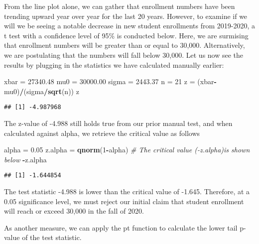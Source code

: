 \documentclass[
]{article}
\newenvironment{Shaded}{\begin{snugshade}}{\end{snugshade}}
\newcommand{\CommentTok}[1]{\textcolor[rgb]{0.56,0.35,0.01}{\textit{#1}}}
\newcommand{\DecValTok}[1]{\textcolor[rgb]{0.00,0.00,0.81}{#1}}
\newcommand{\FloatTok}[1]{\textcolor[rgb]{0.00,0.00,0.81}{#1}}
\newcommand{\KeywordTok}[1]{\textcolor[rgb]{0.13,0.29,0.53}{\textbf{#1}}}
\newcommand{\NormalTok}[1]{#1}
\newcommand{\OperatorTok}[1]{\textcolor[rgb]{0.81,0.36,0.00}{\textbf{#1}}}
\newcommand{\StringTok}[1]{\textcolor[rgb]{0.31,0.60,0.02}{#1}}
\begin{document}
From the line plot alone, we can gather that enrollment numbers have
been trending upward year over year for the last 20 years. However, to
examine if we will we be seeing a notable decrease in new student
enrollments from 2019-2020, a t test with a confidence level of 95\% is
conducted below. Here, we are surmising that enrollment numbers will be
greater than or equal to 30,000. Alternatively, we are postulating that
the numbers will fall below 30,000. Let us now see the results by
plugging in the statistics we have calculated manually earlier:

\begin{Shaded}
\begin{Highlighting}[]
\NormalTok{xbar =}\StringTok{ }\FloatTok{27340.48}
\NormalTok{mu0 =}\StringTok{ }\FloatTok{30000.00}
\NormalTok{sigma =}\StringTok{ }\FloatTok{2443.37}
\NormalTok{n =}\StringTok{ }\DecValTok{21}
\NormalTok{z =}\StringTok{ }\NormalTok{(xbar}\OperatorTok{-}\NormalTok{mu0)}\OperatorTok{/}\NormalTok{(sigma}\OperatorTok{/}\KeywordTok{sqrt}\NormalTok{(n))}
\NormalTok{z}
\end{Highlighting}
\end{Shaded}

\begin{verbatim}
## [1] -4.987968
\end{verbatim}

The z-value of -4.988 still holds true from our prior manual test, and
when calculated against alpha, we retrieve the critical value as follows

\begin{Shaded}
\begin{Highlighting}[]
\NormalTok{alpha =}\StringTok{ }\FloatTok{0.05}
\NormalTok{z.alpha =}\StringTok{ }\KeywordTok{qnorm}\NormalTok{(}\DecValTok{1}\OperatorTok{-}\NormalTok{alpha)}
\CommentTok{# The critical value (-z.alpha)is shown below}
\OperatorTok{-}\NormalTok{z.alpha}
\end{Highlighting}
\end{Shaded}

\begin{verbatim}
## [1] -1.644854
\end{verbatim}

The test statistic -4.988 is lower than the critical value of -1.645.
Therefore, at a 0.05 significance level, we must reject our initial
claim that student enrollment will reach or exceed 30,000 in the fall of
2020.

As another measure, we can apply the pt function to calculate the lower
tail p-value of the test statistic.
\end{document}
